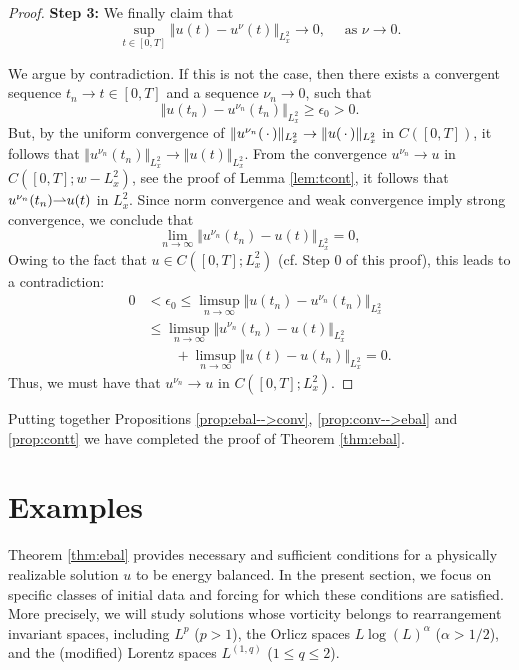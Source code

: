 \documentclass[reqno,12pt]{amsart}
\begin{document}
\begin{proof}
\textbf{Step 3:} We finally claim that
\[
\sup_{t\in [0,T]}
\Vert u(t) - u^\nu(t) \Vert_{L^2_x} \to 0,\quad \text{ as } \nu \to 0.
\]


We argue by contradiction. If this is not the case, then there exists a convergent sequence $t_n \to t \in [0,T]$ and a sequence $\nu_n\to 0$, such that
\[
\Vert u(t_n) - u^{\nu_n}(t_n) \Vert_{L^2_x} \ge \epsilon_0 > 0.
\]
But, by the uniform convergence of $\Vert u^{\nu_n}({\,\cdot\,}) \Vert_{L^2_x} \to \Vert u({\,\cdot\,}) \Vert_{L^2_x}$ in $C([0,T])$, it follows that $\Vert u^{\nu_n}(t_n) \Vert_{L^2_x} \to \Vert u(t)\Vert_{L^2_x}$. From the convergence $u^{\nu_n} \to u$ in $C([0,T];w-L^2_x)$, see the proof of Lemma \ref{lem:tcont}, it follows that $u^{\nu_n}(t_n) {\rightharpoonup} u(t)$ in $L^2_x$. Since norm convergence and weak convergence imply strong convergence, we conclude that
\[
\lim_{n\to \infty} \Vert u^{\nu_n}(t_n) - u(t) \Vert_{L^2_x} = 0,
\]
Owing to the fact that $u\in C([0,T];L^2_x)$ (cf. Step 0 of this proof), this leads to a contradiction:
\begin{align*}
0
&< \epsilon_0 \le
\limsup_{n\to \infty} \Vert u(t_n) - u^{\nu_n}(t_n) \Vert_{L^2_x}
\\
&\le
\limsup_{n\to \infty} \Vert u^{\nu_n}(t_n) - u(t) \Vert_{L^2_x}
\\
&\qquad
+
\limsup_{n\to \infty} \Vert u(t) - u(t_n) \Vert_{L^2_x}
 = 0.
\end{align*}
Thus, we must have that $u^{\nu_n} \to u$ in $C([0,T];L^2_x)$.
\end{proof}

Putting together Propositions \ref{prop:ebal-->conv}, \ref{prop:conv-->ebal} and \ref{prop:contt} we have completed the proof of Theorem \ref{thm:ebal}.

\section{Examples}
\label{sec:examples}

Theorem \ref{thm:ebal}  provides necessary and sufficient conditions for a physically realizable solution $u$ to be energy balanced. In the present section, we focus on specific classes of initial data and forcing for which these conditions are satisfied. More precisely, we will study solutions whose vorticity belongs to rearrangement invariant spaces, including  $L^p$ ($p>1$), the Orlicz spaces $L\log(L)^\alpha$ ($\alpha > 1/2$), and the (modified) Lorentz spaces $L^{(1,q)}$ ($1\le q\le 2$).
\end{document}
